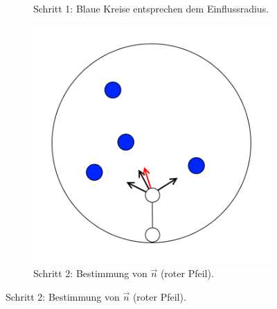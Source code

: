 \begin{figure} [hbtp]
\begin{subfigure}[t]{.3\textwidth}
		\caption{Schritt 1: Blaue Kreise entsprechen dem Einflussradius.}
		\label{subfig:SCA_Basic2}
	\end{subfigure}
	\hspace{.03\textwidth}
	\begin{subfigure}[t]{.3\textwidth}
		\centering
		\includegraphics[width=\linewidth]{images/SCA_Basic3.png}
		\caption{Schritt 2: Bestimmung von $\overrightarrow{n}$ (roter Pfeil).}
		\label{subfig:SCA_Basic3}
	\end{subfigure}


\end{figure}
